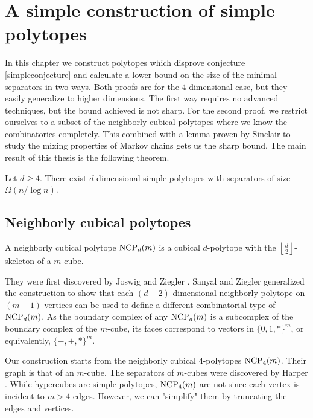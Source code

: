 \chapter{A simple construction of simple polytopes}

In this chapter we construct polytopes which disprove conjecture \ref{simpleconjecture} and
calculate a lower bound on the size of the minimal separators in two ways. Both proofs are for the
4-dimensional case, but they easily generalize to higher dimensions. The first way requires
no advanced techniques, but the bound achieved is not sharp. For the second proof,
we restrict ourselves to a subset of the neighborly cubical polytopes where we know the 
combinatorics completely. This combined with a lemma proven by Sinclair to study
the mixing properties of Markov chains gets us the sharp bound. The main result of this
thesis is the following theorem.


\begin{theorem}
\label{maintheorem}
 Let $d\geq 4$. There exist $d$-dimensional simple polytopes with
separators of size $\Omega(n/\log n)$.
\end{theorem}

\section{Neighborly cubical polytopes}
\label{ncp}

\begin{definition}
A neighborly cubical polytope $\textrm{NCP}_d(m)$ is a cubical $d$-polytope with the $\left\lfloor \frac{d}{2} 
\right\rfloor$-skeleton of a $m$-cube.
\end{definition}

They were first discovered by Joswig and Ziegler \cite{Z62}. Sanyal and Ziegler \cite{Z102}
generalized the construction to show that each $(d-2)$-dimensional neighborly 
polytope on $(m-1)$ vertices can be used to define a 
different combinatorial type of $\textrm{NCP}_d(m)$. As the boundary complex of any $\textrm{NCP}_d(m)$
is a subcomplex of the boundary complex of the $m$-cube, its faces correspond to vectors
in $\{0,1,*\}^m$, or equivalently, $\{-,+,*\}^m$.


Our construction starts from the neighborly cubical 4-polytopes $\textrm{NCP}_4(m)$. 
Their graph is that of an $m$-cube. The separators of $m$-cubes were discovered by Harper 
\cite{Harp}.
While hypercubes are simple polytopes, $\textrm{NCP}_4(m)$ are not since each vertex is 
incident to $m>4$ edges. However, we can "simplify" them by 
truncating the edges and vertices.

